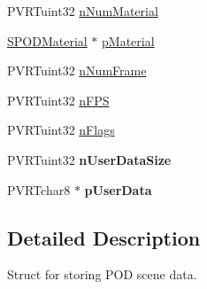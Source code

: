 \begin{DoxyCompactItemize}
P\+V\+R\+Tuint32 \hyperlink{struct_s_p_o_d_scene_a2c75dec98cbb3668f8babe85a6896770}{n\+Num\+Material}
\item 
\hyperlink{struct_s_p_o_d_material}{S\+P\+O\+D\+Material} $\ast$ \hyperlink{struct_s_p_o_d_scene_ae0c7229354a9dad48fa5a7860d0fb574}{p\+Material}
\item 
P\+V\+R\+Tuint32 \hyperlink{struct_s_p_o_d_scene_ac6ef16956132f29da416a71397a2e98b}{n\+Num\+Frame}
\item 
P\+V\+R\+Tuint32 \hyperlink{struct_s_p_o_d_scene_a73079ccb12e0b52f28111f31390ec712}{n\+F\+P\+S}
\item 
P\+V\+R\+Tuint32 \hyperlink{struct_s_p_o_d_scene_a03f26ef383e3f0801654e7b0f2a43e1e}{n\+Flags}
\item 
\hypertarget{struct_s_p_o_d_scene_a8bbd9d99c025479403f0203ba1c4c3b4}{P\+V\+R\+Tuint32 {\bfseries n\+User\+Data\+Size}}\label{struct_s_p_o_d_scene_a8bbd9d99c025479403f0203ba1c4c3b4}

\item 
\hypertarget{struct_s_p_o_d_scene_a75c0dd471064e82dece008d65259da79}{P\+V\+R\+Tchar8 $\ast$ {\bfseries p\+User\+Data}}\label{struct_s_p_o_d_scene_a75c0dd471064e82dece008d65259da79}

\end{DoxyCompactItemize}


\subsection{Detailed Description}
Struct for storing P\+O\+D scene data. 



 

